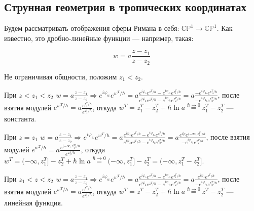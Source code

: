 \documentclass[11pt]{article}
\def\R{\Rightarrow}
\def\ph{\varphi}
\theoremstyle{remark}
\theoremstyle{definition}
\begin{document}
\subsection{Струнная геометрия в тропических координатах}

Будем рассматривать отображения сферы Римана в себя: $\mathbb{CP}^1 \to \mathbb{CP}^1$. Как известно, это дробно-линейные функции --- например, такая:

$$w = a\frac{z-z_1}{z-z_2}$$

Не ограничивая общности, положим $z_1 < z_2$. 

При $z<z_1<z_2$ $w = a\frac{z-z_1}{z-z_2} \R e^{i\ph_w} e^{w^T/\hbar} = a \frac{e^{i\ph_{z}} e^{z^T/\hbar} - e^{i\ph_{z_1}} e^{z_1^T/\hbar} }{e^{i\ph_{z}} e^{z^T/\hbar} - e^{i\ph_{z_2}} e^{z_2^T/\hbar}} =  a \frac{ - e^{i\ph_{z_1}} e^{z_1^T/\hbar} }{- e^{i\ph_{z_2}} e^{z_2^T/\hbar}}$, после взятия модулей $e^{w^T/\hbar} = a \frac{e^{z_1^T/\hbar} }{ e^{z_2^T/\hbar}}$, откуда $w^T = z_1^T - z_2^T + \hbar \ln a \stackrel{\hbar \to 0}{=} \boxed{z_1^T - z_2^T}$ --- константа.

При $z = z_1$ $w = a\frac{z-z_1}{z-z_2} \R e^{i\ph_w} e^{w^T/\hbar} = a \frac{e^{i\ph_{z}} e^{z^T/\hbar} - e^{i\ph_{z_1}} e^{z_1^T/\hbar} }{e^{i\ph_{z}} e^{z^T/\hbar} - e^{i\ph_{z_2}} e^{z_2^T/\hbar}} =  a \frac{ e^{i\tilde\ph} e^{(-\infty, z_1^T]/\hbar} }{- e^{i\ph_{z_2}} e^{z_2^T/\hbar}}$, после взятия модулей $e^{w^T/\hbar} = a \frac{e^{(-\infty, z_1^T]/\hbar} }{ e^{z_2^T/\hbar}}$, откуда $w^T = (-\infty, z_1^T] - z_2^T + \hbar \ln a \stackrel{\hbar \to 0}{=} (-\infty, z_1^T] - z_2^T = \boxed{(-\infty, z_1^T - z_2^T]}$.


При $z_1<z<z_2$ $w = a\frac{z-z_1}{z-z_2} \R e^{i\ph_w} e^{w^T/\hbar} = a \frac{e^{i\ph_{z}} e^{z^T/\hbar} - e^{i\ph_{z_1}} e^{z_1^T/\hbar} }{e^{i\ph_{z}} e^{z^T/\hbar} - e^{i\ph_{z_2}} e^{z_2^T/\hbar}} =  a \frac{ e^{i\ph_{z}} e^{z^T/\hbar} }{- e^{i\ph_{z_2}} e^{z_2^T/\hbar}}$, после взятия модулей $e^{w^T/\hbar} = a \frac{e^{z^T/\hbar} }{ e^{z_2^T/\hbar}}$, откуда $w^T = z^T - z_2^T + \hbar \ln a \stackrel{\hbar \to 0}{=} \boxed{z^T - z_2^T}$ --- линейная функция.
\end{document}
